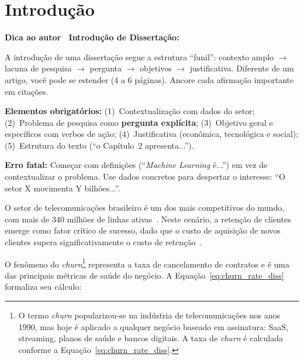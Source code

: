\documentclass[
    12pt,
    oneside,
    a4paper,
    english,
    brazilian
    ]{abntex2}
\numberwithin{equation}{chapter}
\newenvironment{dica}{%
    \par\medskip
    \color{blue!60!black}\small\itshape
}{%
    \par\medskip
}
\begin{document}
\listoffigures*
\newpage

\listoftables*
\newpage

\textual

\chapter{Introdução}

\begin{dica}
\noindent\textbf{Dica ao autor \textemdash\ Introdução de Dissertação:}

A introdução de uma dissertação segue a estrutura ``funil'': contexto amplo $\to$ lacuna de pesquisa $\to$ pergunta $\to$ objetivos $\to$ justificativa. Diferente de um artigo, você pode se estender (4 a 6 páginas). Ancore cada afirmação importante em citações.

\textbf{Elementos obrigatórios:} (1)~Contextualização com dados do setor; (2)~Problema de pesquisa como \textbf{pergunta explícita}; (3)~Objetivo geral e específicos com verbos de ação; (4)~Justificativa (econômica, tecnológica e social); (5)~Estrutura do texto (``o Capítulo~2 apresenta...'').

\textbf{Erro fatal:} Começar com definições (``\textit{Machine Learning} é...'') em vez de contextualizar o problema. Use dados concretos para despertar o interesse: ``O setor X movimenta Y bilhões...''.
\end{dica}

O setor de telecomunicações brasileiro é um dos mais competitivos do mundo, com mais de 340 milhões de linhas ativas~\cite{souza2023}. Neste cenário, a retenção de clientes emerge como fator crítico de sucesso, dado que o custo de aquisição de novos clientes supera significativamente o custo de retenção~\cite{provost2013}.

O fenômeno do \textit{churn}\footnote{O termo \textit{churn} popularizou-se na indústria de telecomunicações nos anos 1990, mas hoje é aplicado a qualquer negócio baseado em assinatura: SaaS, streaming, planos de saúde e bancos digitais. A taxa de \textit{churn} é calculada conforme a Equação~\ref{eq:churn_rate_diss}.} representa a taxa de cancelamento de contratos e é uma das principais métricas de saúde do negócio. A Equação~\ref{eq:churn_rate_diss} formaliza seu cálculo:
\end{document}
